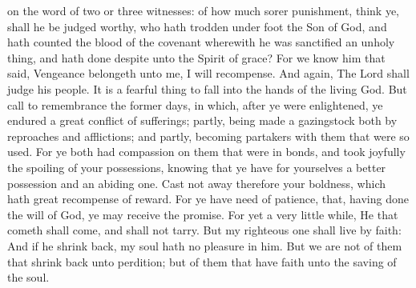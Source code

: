 on the word of two or three witnesses: of how much sorer punishment, think ye, shall he be judged worthy, who hath trodden under foot the Son of God, and hath counted the blood of the covenant wherewith he was sanctified an unholy thing, and hath done despite unto the Spirit of grace? For we know him that said, Vengeance belongeth unto me, I will recompense. And again, The Lord shall judge his people. It is a fearful thing to fall into the hands of the living God.  But call to remembrance the former days, in which, after ye were enlightened, ye endured a great conflict of sufferings; partly, being made a gazingstock both by reproaches and afflictions; and partly, becoming partakers with them that were so used. For ye both had compassion on them that were in bonds, and took joyfully the spoiling of your possessions, knowing that ye have for yourselves a better possession and an abiding one. Cast not away therefore your boldness, which hath great recompense of reward. For ye have need of patience, that, having done the will of God, ye may receive the promise.  For yet a very little while, He that cometh shall come, and shall not tarry.  But my righteous one shall live by faith: And if he shrink back, my soul hath no pleasure in him.  But we are not of them that shrink back unto perdition; but of them that have faith unto the saving of the soul. 

